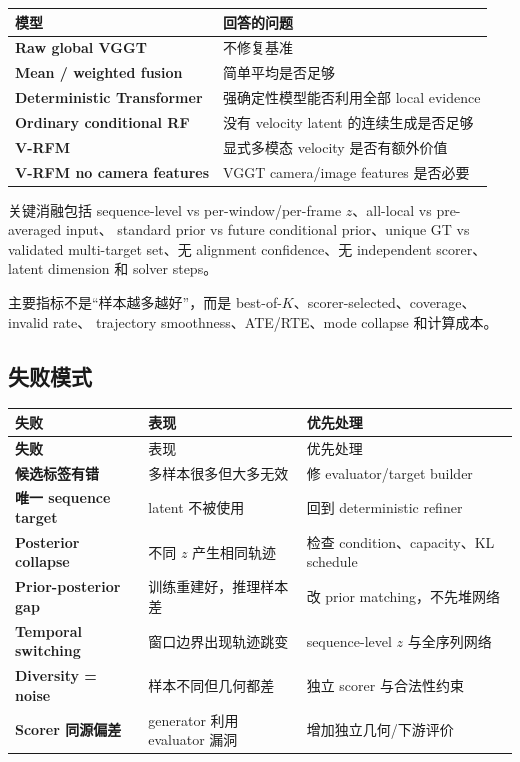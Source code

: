 \documentclass[UTF8,a4paper,11pt]{ctexart}
\begin{document}
\begin{table}[htbp]
  \centering
  \small
  \begin{tabularx}{\textwidth}{>{\raggedright\arraybackslash\bfseries}p{4.5cm}
    >{\raggedright\arraybackslash}X}
    \toprule
    模型 & 回答的问题 \\
    \midrule
    Raw global VGGT & 不修复基准 \\
    Mean / weighted fusion & 简单平均是否足够 \\
    Deterministic Transformer & 强确定性模型能否利用全部 local evidence \\
    Ordinary conditional RF & 没有 velocity latent 的连续生成是否足够 \\
    V-RFM & 显式多模态 velocity 是否有额外价值 \\
    V-RFM no camera features & VGGT camera/image features 是否必要 \\
    \bottomrule
  \end{tabularx}
\end{table}

关键消融包括 sequence-level vs per-window/per-frame $z$、all-local vs pre-averaged input、
standard prior vs future conditional prior、unique GT vs validated multi-target set、无 alignment
confidence、无 independent scorer、latent dimension 和 solver steps。

主要指标不是“样本越多越好”，而是 best-of-$K$、scorer-selected、coverage、invalid rate、
trajectory smoothness、ATE/RTE、mode collapse 和计算成本。

\subsection{失败模式}

\begin{longtable}{>{\raggedright\arraybackslash\bfseries}p{3.6cm}
  >{\raggedright\arraybackslash}p{5.1cm}
  >{\raggedright\arraybackslash}p{5.8cm}}
  \toprule
  失败 & 表现 & 优先处理 \\
  \midrule
  \endfirsthead
  \toprule
  失败 & 表现 & 优先处理 \\
  \midrule
  \endhead
  候选标签有错 & 多样本很多但大多无效 & 修 evaluator/target builder \\
  唯一 sequence target & latent 不被使用 & 回到 deterministic refiner \\
  Posterior collapse & 不同 $z$ 产生相同轨迹 & 检查 condition、capacity、KL schedule \\
  Prior-posterior gap & 训练重建好，推理样本差 & 改 prior matching，不先堆网络 \\
  Temporal switching & 窗口边界出现轨迹跳变 & sequence-level $z$ 与全序列网络 \\
  Diversity = noise & 样本不同但几何都差 & 独立 scorer 与合法性约束 \\
  Scorer 同源偏差 & generator 利用 evaluator 漏洞 & 增加独立几何/下游评价 \\
  \bottomrule
\end{longtable}
\end{document}
